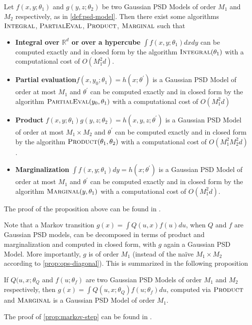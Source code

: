 \begin{proposition}\label{prop:ops-diagonal}
    Let $f(x, y; \theta_1)$ and $g(y, z; \theta_2)$ be two Gaussian PSD Models of order $M_1$ and $M_2$ respectively, as in \cref{def:psd-model}. Then there exist some algorithms $\operatorname{\textsc{Integral}}$, $\operatorname{\textsc{PartialEval}}$, $\operatorname{\textsc{Product}}$, $\operatorname{\textsc{Marginal}}$ such that
    \begin{itemize}
        \item \textbf{ Integral over $\mathbb R^d$ or over a hypercube} $\int f(x, y; \theta_1)dxdy$ can be computed exactly and in closed form by the algorithm $\operatorname{\textsc{Integral}}(\theta_1)$ with a computational cost of $O(M_1^2 d)$.
        \item \textbf{ Partial evaluation}$f(x, y_0; \theta_1) = h(x; \theta^\prime)$ is a Gaussian PSD Model of order at most $M_1$ and $\theta^\prime$ can be computed exactly and in closed form by the algorithm $\operatorname{\textsc{PartialEval}}(y_0, \theta_1)$ with a computational cost of $O(M_1^2 d)$
        \item \textbf{ Product} $f(x, y; \theta_1)g(y, z; \theta_2)=h(x, y, z; \theta^\prime)$ is a Gaussian PSD Model of order at most $M_1\times M_2$ and $\theta^\prime$  can be computed exactly and in closed form by the algorithm $\operatorname{\textsc{Product}}(\theta_1, \theta_2)$ with a computational cost of $O(M_1^2 M_2^2 d)$.
        \item \textbf{ Marginalization} $\int f(x, y; \theta_1)dy=h(x; \theta^\prime)$ is a Gaussian PSD Model of order at most $M_1$ and $\theta^\prime$ can be computed exactly and in closed form by the algorithm $\operatorname{\textsc{Marginal}}(y, \theta_1)$ with a computational cost of $O(M_1^2 d)$.
    \end{itemize}
\end{proposition}
The proof of the proposition above can be found in \citep[Appendix F]{ciliberto2021}.

Note that a Markov transition $g(x) = \int Q(u, x)f(u)du$, when $Q$ and $f$ are Gaussian PSD models, can be decomposed in terms of product and marginalization and computed in closed form, with $g$ again a Gaussian PSD Model. More importantly,  $g$ is of order $M_1$ (instead of the naïve $M_1\times M_2$ according to \cref{prop:ops-diagonal}). This is summarized in the following proposition

\begin{proposition}\label{prop:markov-step}
   If $Q(u, x; \theta_Q$ and $f(u; \theta_f)$ are two Gaussian PSD Models of order $M_1$ and $M_2$ respectively, then $g(x) = \int Q(u, x;\theta_Q)f(u;\theta_f)du$, computed via $\operatorname{\textsc{Product}}$ and $\operatorname{\textsc{Marginal}}$ is a Gaussian PSD Model of order $M_1$.
\end{proposition}
The proof of \cref{prop:markov-step} can be found in \citep[Appendix F.5]{ciliberto2021}.

